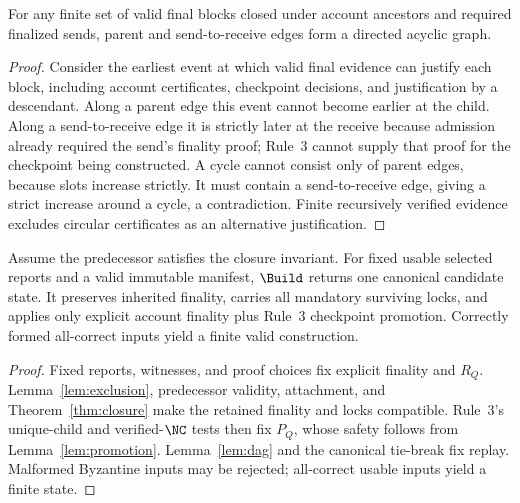 \begin{lemma}
\label{lem:dag}
For any finite set of valid final blocks closed under account ancestors and required finalized sends, parent and send-to-receive edges form a directed acyclic graph.
\end{lemma}
\begin{proof}
Consider the earliest event at which valid final evidence can justify each block, including account certificates, checkpoint decisions, and justification by a descendant. Along a parent edge this event cannot become earlier at the child. Along a send-to-receive edge it is strictly later at the receive because admission already required the send's finality proof; Rule~3 cannot supply that proof for the checkpoint being constructed. A cycle cannot consist only of parent edges, because slots increase strictly. It must contain a send-to-receive edge, giving a strict increase around a cycle, a contradiction. Finite recursively verified evidence excludes circular certificates as an alternative justification.
\end{proof}

\begin{lemma}
\label{lem:construction}
Assume the predecessor satisfies the closure invariant. For fixed usable selected reports and a valid immutable manifest, $\Build$ returns one canonical candidate state. It preserves inherited finality, carries all mandatory surviving locks, and applies only explicit account finality plus Rule~3 checkpoint promotion. Correctly formed all-correct inputs yield a finite valid construction.
\end{lemma}
\begin{proof}
Fixed reports, witnesses, and proof choices fix explicit finality and $R_Q$. Lemma~\ref{lem:exclusion}, predecessor validity, attachment, and Theorem~\ref{thm:closure} make the retained finality and locks compatible. Rule~3's unique-child and verified-$\NC$ tests then fix $P_Q$, whose safety follows from Lemma~\ref{lem:promotion}. Lemma~\ref{lem:dag} and the canonical tie-break fix replay. Malformed Byzantine inputs may be rejected; all-correct usable inputs yield a finite state.
\end{proof}

